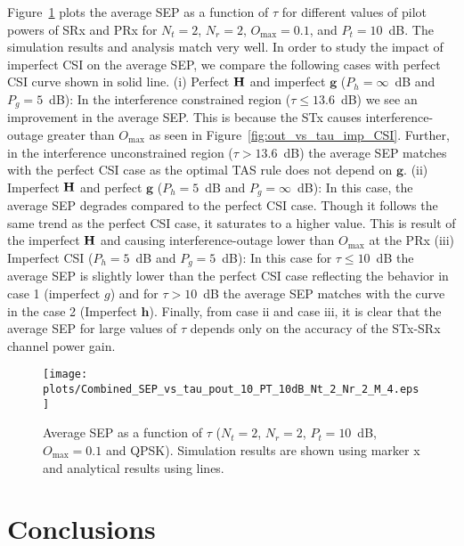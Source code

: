 \documentclass[12pt,draftcls,peerreview,onecolumn]{IEEEtran}
\newcommand{\mtx}[1]{{\bf #1}} %
\newcommand{\Nt}{{N_t}}
\newcommand{\Nr}{{N_r}}
\newcommand{\Pt}{{P_t}}
\newcommand{\such}{h}
\newcommand{\puch}{g}
\newcommand{\h}{\mathbf{\such}}
\newcommand{\g}{\mathbf{\puch}}
\newcommand{\outmax}{O_{\text{max}}}
\newcommand{\itau}{\tau}
\newcommand{\Hmx}{\mtx{H}}
\newcommand{\gpilotpower}{P_g}
\newcommand{\hpilotpower}{P_h}
\begin{document}
Figure~\ref{fig:sep_vs_tau_imp_CSI} plots the average SEP as a function of $\itau$ for 
different values of pilot powers of SRx and PRx for $\Nt=2$, $\Nr=2$, $\outmax = 0.1$, and $\Pt=10$~dB. The simulation results and analysis match very well. In order to study the impact of imperfect CSI on the average SEP, we compare the following cases with perfect CSI curve shown in solid line.  (i) Perfect $\Hmx$ and imperfect $\g$ ($\hpilotpower=\infty$~dB and $\gpilotpower=5$~dB): In the interference constrained region ($\itau\leq 13.6$~dB) we see an improvement in the average SEP. This is because the STx causes interference-outage greater than $\outmax$ as seen in Figure~\ref{fig:out_vs_tau_imp_CSI}. Further, in the interference unconstrained region ($\itau> 13.6$~dB) the average SEP matches with the perfect CSI case as the optimal TAS rule does not depend on $\g$. (ii) Imperfect $\Hmx$ and perfect $\g$ ($\hpilotpower=5$~dB and $\gpilotpower=\infty$~dB): In this case, the average SEP degrades compared to the perfect CSI case. Though it follows the same trend as the perfect CSI case, it saturates to a higher value. This is result of the imperfect $\Hmx$ and causing interference-outage lower than  $\outmax$ at the PRx (iii) Imperfect CSI ($\hpilotpower=5$~dB and $\gpilotpower=5$~dB): In this case for $\itau\leq 10$~dB the average SEP is slightly lower than the perfect CSI case reflecting the behavior in case 1 (imperfect $g$) and for $\itau>10$~dB the average SEP matches with the curve in the case 2 (Imperfect $\h$). Finally, from case ii and case iii, it is clear that the average SEP for large values of $\itau$ depends only on the accuracy of the STx-SRx channel power gain.

\begin{figure}
	\centering \texttt{[image: plots/Combined\_SEP\_vs\_tau\_pout\_10\_PT\_10dB\_Nt\_2\_Nr\_2\_M\_4.eps]}
	\caption{Average SEP as a function of $\itau$ ($\Nt=2$, $\Nr=2$, $\Pt=10$~dB, $\outmax = 0.1$ and QPSK). Simulation results are shown using marker x and analytical results using lines.}
	\label{fig:sep_vs_tau_imp_CSI}
\end{figure}




\section{Conclusions}
\label{sec:conclusions}


\appendix
\end{document}
